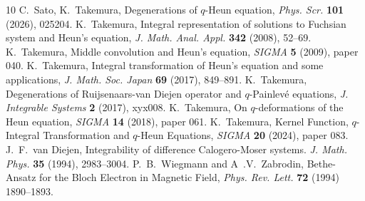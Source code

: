 \documentclass[12pt]{amsart}
\numberwithin{equation}{section}
\theoremstyle{definition}
\theoremstyle{remark}
\begin{document}
\begin{thebibliography}{10}
C.~Sato, K.~Takemura, Degenerations of $q$-Heun equation, {\it Phys. Scr.} {\bf 101} (2026), 025204.
K.~Takemura, Integral representation of solutions to Fuchsian system and Heun's equation, {\it J. Math. Anal. Appl.} {\bf 342} (2008), 52--69.
K.~Takemura, Middle convolution and Heun's equation, {\it SIGMA} {\bf 5} (2009), paper 040.
K.~Takemura, Integral transformation of Heun's equation and some applications, {\it J. Math. Soc. Japan} {\bf 69} (2017), 849--891.
K.~Takemura, Degenerations of Ruijsenaars-van Diejen operator and $q$-Painlev\'e equations, {\it J. Integrable Systems} {\bf 2} (2017), xyx008.
K.~Takemura, On $q$-deformations of the Heun equation, {\it SIGMA} {\bf 14} (2018), paper 061.
K.~Takemura, Kernel Function, $q$-Integral Transformation and $q$-Heun Equations, \textit{SIGMA} \textbf{20} (2024), paper 083.
J.~F.~van Diejen, Integrability of difference Calogero-Moser systems. {\it J. Math. Phys.} {\bf 35} (1994), 2983--3004. 
P.~B.~Wiegmann and A~.V.~Zabrodin, Bethe-Ansatz for the Bloch Electron in Magnetic Field, {\it Phys. Rev. Lett.} {\bf 72} (1994) 1890--1893.
\end{thebibliography}
\end{document}
